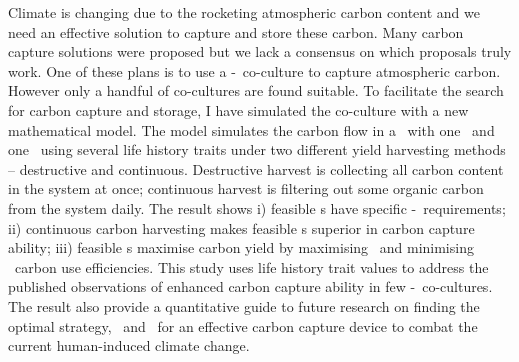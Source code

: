 \documentclass[../thesis.tex]{subfiles} %
\begin{document}
Climate is changing due to the rocketing atmospheric carbon content and we need an effective solution to capture and store these carbon.  Many carbon capture solutions were proposed but we lack a consensus on which proposals truly work.  One of these plans is to use a \phy-\bac\ co-culture to capture atmospheric carbon.  However only a handful of co-cultures are found suitable.  To facilitate the search for carbon capture and storage, I have simulated the co-culture with a new mathematical model.  The model simulates the carbon flow in a \pbs\ with one \phy\ and one \bac\ using several life history traits under two different yield harvesting methods -- destructive and continuous.  Destructive harvest is collecting all carbon content in the system at once; continuous harvest is filtering out some organic carbon from the system daily.  The result shows \Rn{1}) feasible \pbs s have specific \phy-\bac\ requirements; \Rn{2}) continuous carbon harvesting makes feasible \pbs s superior in carbon capture ability; \Rn{3}) feasible \pbs s maximise carbon yield by maximising \phy\ and minimising \bac\ carbon use efficiencies.  This study uses life history trait values to address the published observations of enhanced carbon capture ability in few \phy-\bac\ co-cultures.  The result also provide a quantitative guide to future research on finding the optimal strategy, \phy\ and \bac\ for an effective carbon capture device to combat the current human-induced climate change.
\end{document}
